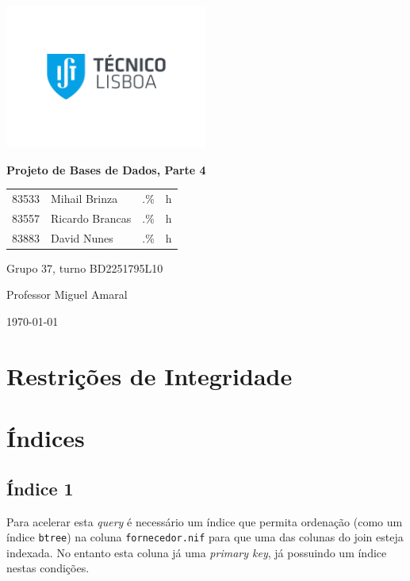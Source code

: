 \documentclass[a4paper]{article}
\begin{document}
    \begin{titlepage}
        \centering
        \includegraphics[width=0.5\textwidth]{IST_A_CMYK_POS.pdf}\par
        {\huge\bfseries Projeto de Bases de Dados, Parte 4\par}
        \vspace{2cm}
        {
        \Large
        \begin{tabular}{llll}
            83533 & Mihail Brinza & .\% & h \\
            83557 & Ricardo Brancas & .\% & h \\
            83883 & David Nunes & .\% & h
        \end{tabular}
        }
        \vfill
        \large
        Grupo 37, turno BD2251795L10 \par
        Professor Miguel Amaral

        \vspace{3cm}

        {\normalsize \today\par}
    \end{titlepage}

    \section{Restrições de Integridade}

    \section{Índices}

    \subsection{Índice 1}
    Para acelerar esta \textit{query} é necessário um índice que permita ordenação (como um índice
    \lstinline{btree}) na coluna \lstinline{fornecedor.nif} para que uma das colunas do join esteja
    indexada. No entanto esta coluna já uma \textit{primary key}, já possuindo um índice nestas condições.
\end{document}
